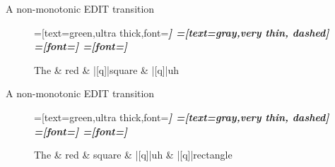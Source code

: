 \documentclass{lecture}
\begin{document}
\begin{plain}{A non-monotonic EDIT transition}

\begin{figure}
    \centering
    \begin{dependency}[theme=simple]
    =[text=green,ultra thick,font=\bfseries\itshape]
    =[text=gray,very thin, dashed]
    =[font=\bfseries\itshape]
    =[font=\itshape]
    \begin{deptext}[column sep=.075cm, row sep=.1ex]
        The \& red \& |[q]|square \& |[q]|uh \\
    \end{deptext}
\end{dependency}
\end{figure}
\end{plain}



\begin{plain}{A non-monotonic EDIT transition}

\begin{figure}
    \centering
    \begin{dependency}[theme=simple]
    =[text=green,ultra thick,font=\bfseries\itshape]
    =[text=gray,very thin, dashed]
    =[font=\bfseries\itshape]
    =[font=\itshape]
    \begin{deptext}[column sep=.075cm, row sep=.1ex]
        The \& red \& square \& |[q]|uh \& |[q]|rectangle \\
    \end{deptext}
\end{dependency}
\end{figure}
\end{plain}
\end{document}
